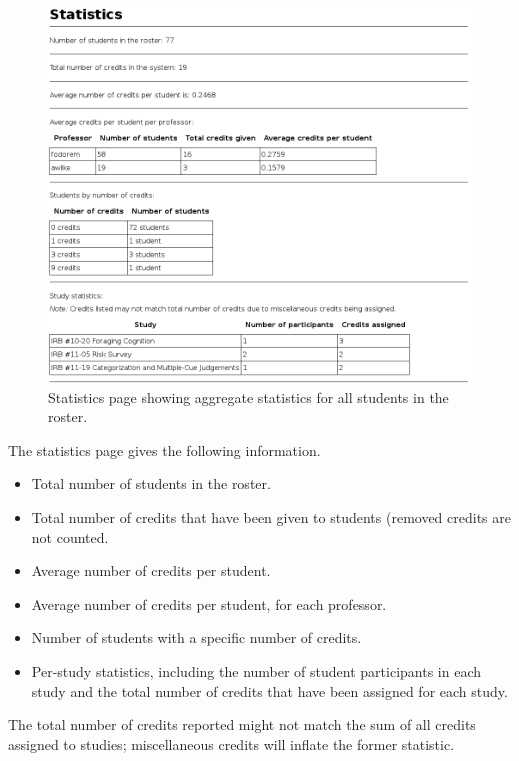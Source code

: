 \documentclass[letterpaper,titlepage]{article}
\begin{document}
\begin{figure}[H]
\includegraphics[width=\textwidth]{images/ra_stats.png}
\caption{Statistics page showing aggregate statistics for all students in the roster.}
\label{ra_stats}
\end{figure}

The statistics page gives the following information.

\begin{itemize}
\item{Total number of students in the roster.}
\item{Total number of credits that have been given to students (removed credits are not counted.}
\item{Average number of credits per student.}
\item{Average number of credits per student, for each professor.}
\item{Number of students with a specific number of credits.}
\item{Per-study statistics, including the number of student participants in each study and the total number of credits that have been assigned for each study.}
\end{itemize}

The total number of credits reported might not match the sum of all credits assigned to studies; miscellaneous credits will inflate the former statistic.

\newpage
\end{document}
